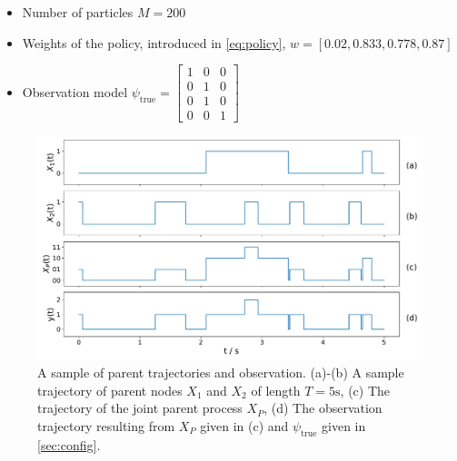 \begin{itemize}
	\item Number of particles $ M = 200 $
	\item Weights of the policy, introduced in \autoref{eq:policy}, $ w = [0.02, 0.833, 0.778, 0.87] $
	\item Observation model
	$\psi_{\text{true}} =
	\begin{bmatrix}
	1 & 0 & 0 \\
	0 & 1 & 0 \\
	0 & 1 & 0 \\
	0 & 0 & 1
	\end{bmatrix}$
\end{itemize}
\begin{figure}[t]
	\begin{center}
		\includegraphics[width=.90\textwidth]{figures/sim_example/parent_traj}
		\caption[Parent trajectories and observation]{A sample of parent trajectories and observation. (a)-(b) A sample trajectory of parent nodes $ X_1 $ and $ X_2 $ of length $ T=5\text{s} $, (c) The trajectory of the joint parent process $ X_P $, (d) The observation trajectory resulting from $ X_P $ given in (c) and $ \psi_{\text{true}} $ given in \cref{sec:config}.}
		\label{fig:parent_traj}
	\end{center}
\end{figure}
